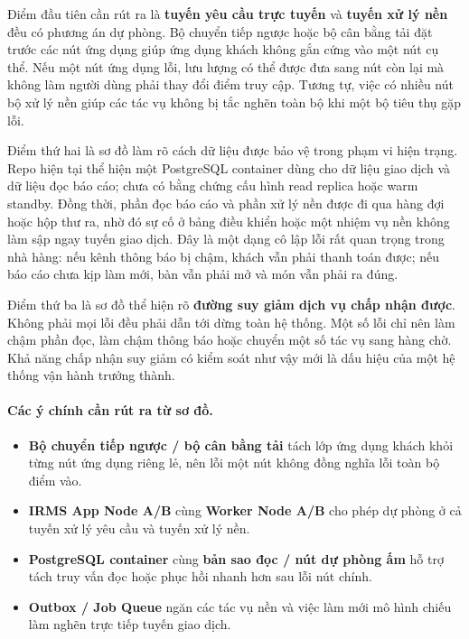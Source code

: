\documentclass[11pt,a4paper]{article}
\begin{document}
Điểm đầu tiên cần rút ra là \textbf{tuyến yêu cầu trực tuyến} và \textbf{tuyến xử lý nền} đều có phương án dự phòng. Bộ chuyển tiếp ngược hoặc bộ cân bằng tải đặt trước các nút ứng dụng giúp ứng dụng khách không gắn cứng vào một nút cụ thể. Nếu một nút ứng dụng lỗi, lưu lượng có thể được đưa sang nút còn lại mà không làm người dùng phải thay đổi điểm truy cập. Tương tự, việc có nhiều nút bộ xử lý nền giúp các tác vụ không bị tắc nghẽn toàn bộ khi một bộ tiêu thụ gặp lỗi.

Điểm thứ hai là sơ đồ làm rõ cách dữ liệu được bảo vệ trong phạm vi hiện trạng. Repo hiện tại thể hiện một \textsf{PostgreSQL container} dùng cho dữ liệu giao dịch và dữ liệu đọc báo cáo; chưa có bằng chứng cấu hình read replica hoặc warm standby. Đồng thời, phần đọc báo cáo và phần xử lý nền được đi qua hàng đợi hoặc hộp thư ra, nhờ đó sự cố ở bảng điều khiển hoặc một nhiệm vụ nền không làm sập ngay tuyến giao dịch. Đây là một dạng cô lập lỗi rất quan trọng trong nhà hàng: nếu kênh thông báo bị chậm, khách vẫn phải thanh toán được; nếu báo cáo chưa kịp làm mới, bàn vẫn phải mở và món vẫn phải ra đúng.

Điểm thứ ba là sơ đồ thể hiện rõ \textbf{đường suy giảm dịch vụ chấp nhận được}. Không phải mọi lỗi đều phải dẫn tới dừng toàn hệ thống. Một số lỗi chỉ nên làm chậm phần đọc, làm chậm thông báo hoặc chuyển một số tác vụ sang hàng chờ. Khả năng chấp nhận suy giảm có kiểm soát như vậy mới là dấu hiệu của một hệ thống vận hành trưởng thành.

\paragraph{Các ý chính cần rút ra từ sơ đồ.}
\begin{itemize}
  \item \textbf{Bộ chuyển tiếp ngược / bộ cân bằng tải} tách lớp ứng dụng khách khỏi từng nút ứng dụng riêng lẻ, nên lỗi một nút không đồng nghĩa lỗi toàn bộ điểm vào.
  \item \textbf{IRMS App Node A/B} cùng \textbf{Worker Node A/B} cho phép dự phòng ở cả tuyến xử lý yêu cầu và tuyến xử lý nền.
  \item \textbf{PostgreSQL container} cùng \textbf{bản sao đọc / nút dự phòng ấm} hỗ trợ tách truy vấn đọc hoặc phục hồi nhanh hơn sau lỗi nút chính.
  \item \textbf{Outbox / Job Queue} ngăn các tác vụ nền và việc làm mới mô hình chiếu làm nghẽn trực tiếp tuyến giao dịch.
\end{itemize}
\end{document}
